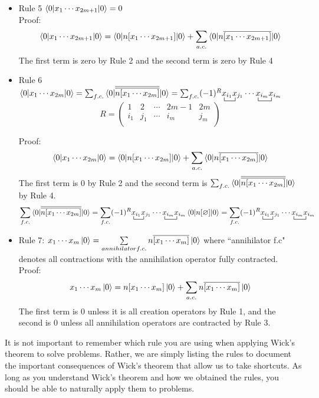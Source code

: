 \documentclass{article}
\newcommand{\ol}{\overline}
\newcommand{\ctr}{\bcontraction}
\newcommand{\cd}{\ensuremath{\cdots} }
\begin{document}
\begin{itemize}
\item Rule 5 $\braket{0 | x_1 \cd x_{2m + 1} | 0} = 0 $ \\

Proof: 
\[\braket{0 | x_1 \cd x_{2m + 1} | 0}   =  \braket{0 | n[x_1 \cd x_{2m + 1}] | 0}  +  \sum_{a.c.} \braket{0 | n\ol{[x_1 \cd x_{2m + 1}]} | 0}  \]
The first term is zero by Rule 2 and the second term is zero by Rule 4

 \item Rule 6 $\braket{0 | x_1 \cd x_{2m } | 0} = \sum_{f.c.} \braket{0 | \ol{\ol{ n[x_1 \cd x_{2m }]}}|0} = \sum_{f.c.} (-1)^R \ctr{}{x}{{}_{i_1}}{x}  x_{i_1} x_{j_1} \cd \ctr{}{x}{{}_{i_m}}{x} x_{i_m} x_{i_m}$\\

\begin{equation*}
R = 
\begin{pmatrix}
1 & 2 &\cd  & 2m - 1 & 2m  \\
i_1 & j_1 & \cd  & i_m & j_m \\
\end{pmatrix}
\end{equation*}

Proof: 
\[\braket{0 | x_1 \cd x_{2m} | 0}   =  \braket{0 | n[x_1 \cd x_{2m}] | 0}  +  \sum_{a.c.} \braket{0 | n\ol{[x_1 \cd x_{2m}]} | 0}  \]
The first term is 0 by Rule 2 and the second term is $ \sum_{f.c.} \braket{0 | \ol{\ol{ n[x_1 \cd x_{2m }]}}|0}$ by Rule 4. 
\[ \sum_{f.c.} \braket{0 | \ol{\ol{ n[x_1 \cd x_{2m }]}}|0} =  \sum_{f.c.} (-1)^R  \ctr{}{x}{{}_{i_1}}{x}  x_{i_1} x_{j_1} \cd \ctr{}{x}{{}_{i_m}}{x} x_{i_m} x_{i_m} \braket{0 | n[\varnothing] | 0} = \sum_{f.c.} (-1)^R \ctr{}{x}{{}_{i_1}}{x}  x_{i_1} x_{j_1} \cd \ctr{}{x}{{}_{i_m}}{x} x_{i_m} x_{i_m} \]

\item Rule 7: $x_1 \cd x_m \ket{0} = \sum\limits_{annihilator f.c.} n\ol{[x_1 \cd x_m] }\ket{0} $
where ``annihilator f.c" denotes all contractions with the annihilation operator fully contracted.\\

Proof: 
\[x_1 \cd x_m \ket{0} = n[x_1 \cd x_m] \ket{0} + \sum_{a.c.} n\ol{[x_1 \cd x_m ]} \ket{0} \]
The first term is 0 unless it is all creation operators by Rule 1, and the second is 0 unless all annihilation operators are contracted by Rule 3. 
\end{itemize}
It is not important to remember which rule you are using when applying Wick's theorem to solve problems. 
Rather, we are simply listing the rules to document the important consequences of Wick's theorem that allow us to take shortcuts.
As long as you understand Wick's theorem and how we obtained the rules, you should be able to naturally apply them to problems. 
\end{document}
